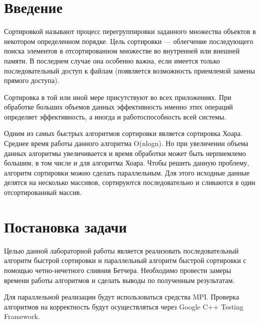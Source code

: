 \documentclass{report}
\begin{document}
\setcounter{page}{2}

\tableofcontents
\newpage

\section*{Введение}
Сортировкой называют процесс перегруппировки заданного множества объектов в некотором определенном порядке. 
Цель сортировки — облегчение последующего поиска элементов в отсортированном множестве во внутренней или внешней памяти. В последнем случае она особенно важна, если имеется только последовательный доступ к файлам (появляется возможность приемлемой замены прямого доступа).
\par Сортировка в той или иной мере присутствуют во всех приложениях. При обработке больших объемов данных эффективность именно этих операций определяет эффективность, а иногда и работоспособность всей системы.
\par Одним из самых быстрых алгоритмов сортировки является сортировка Хоара. Среднее время работы данного алгоритма O(nlogn).  Но при увеличении объема данных алгоритмы увеличивается и время обработки может быть нерпиемлемо большим, в том числе и для алгоритма Хоара. Чтобы решить данную проблему, алгоритм сортировки можно сделать параллельным. Для этого исходные данные делятся на несколько массивов, сортируются последовательно и сливаются в один отсортированный массив. 
\newpage

\section*{Постановка задачи}
Целью данной лабораторной работы является реализовать последовательный алгоритм быстрой сортировки и параллельный алгоритм быстрой сортировки с помощью четно-нечетного слияния Бетчера.  Необходимо провести замеры времени работы алгоритмов и сделать выводы по полученным результатам.
\par Для параллельной реализации будут использоваться средства MPI. Проверка алгоритмов на корректность будут осуществляться через Google C++ Testing Framework.
\newpage

\end{document}
